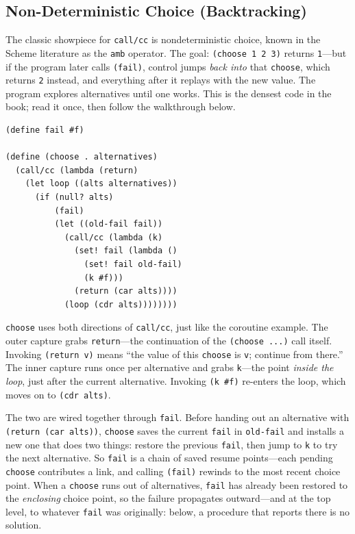 \subsection{Non-Deterministic Choice (Backtracking)}

The classic showpiece for \texttt{call/cc} is nondeterministic choice, known in the Scheme literature as the \texttt{amb} operator. The goal: \texttt{(choose 1 2 3)} returns \texttt{1}---but if the program later calls \texttt{(fail)}, control jumps \emph{back into} that \texttt{choose}, which returns \texttt{2} instead, and everything after it replays with the new value. The program explores alternatives until one works. This is the densest code in the book; read it once, then follow the walkthrough below.

\begin{lstlisting}
(define fail #f)

(define (choose . alternatives)
  (call/cc (lambda (return)
    (let loop ((alts alternatives))
      (if (null? alts)
          (fail)
          (let ((old-fail fail))
            (call/cc (lambda (k)
              (set! fail (lambda ()
                (set! fail old-fail)
                (k #f)))
              (return (car alts))))
            (loop (cdr alts))))))))
\end{lstlisting}

\texttt{choose} uses both directions of \texttt{call/cc}, just like the coroutine example. The outer capture grabs \texttt{return}---the continuation of the \texttt{(choose ...)} call itself. Invoking \texttt{(return v)} means ``the value of this \texttt{choose} is \texttt{v}; continue from there.'' The inner capture runs once per alternative and grabs \texttt{k}---the point \emph{inside the loop}, just after the current alternative. Invoking \texttt{(k \#f)} re-enters the loop, which moves on to \texttt{(cdr alts)}.

The two are wired together through \texttt{fail}. Before handing out an alternative with \texttt{(return (car alts))}, \texttt{choose} saves the current \texttt{fail} in \texttt{old-fail} and installs a new one that does two things: restore the previous \texttt{fail}, then jump to \texttt{k} to try the next alternative. So \texttt{fail} is a chain of saved resume points---each pending \texttt{choose} contributes a link, and calling \texttt{(fail)} rewinds to the most recent choice point. When a \texttt{choose} runs out of alternatives, \texttt{fail} has already been restored to the \emph{enclosing} choice point, so the failure propagates outward---and at the top level, to whatever \texttt{fail} was originally: below, a procedure that reports there is no solution.

